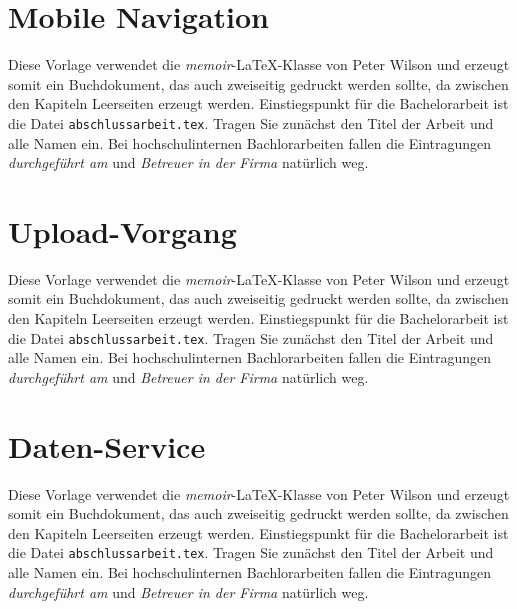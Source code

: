 \section{Mobile Navigation}
\label{sec:umsetzung}
%
Diese Vorlage verwendet die \textit{memoir}-LaTeX-Klasse von Peter Wilson und erzeugt somit ein Buchdokument, das auch zweiseitig gedruckt werden sollte, da zwischen den Kapiteln Leerseiten erzeugt werden. Einstiegspunkt für die Bachelorarbeit ist die Datei \texttt{abschlussarbeit.tex}. Tragen Sie zunächst den Titel der Arbeit und alle Namen ein. Bei hochschulinternen Bachlorarbeiten fallen die Eintragungen \textit{durchgeführt am} und \textit{Betreuer in der Firma} natürlich weg.

\section{Upload-Vorgang}
\label{sec:umsetzung}
%
Diese Vorlage verwendet die \textit{memoir}-LaTeX-Klasse von Peter Wilson und erzeugt somit ein Buchdokument, das auch zweiseitig gedruckt werden sollte, da zwischen den Kapiteln Leerseiten erzeugt werden. Einstiegspunkt für die Bachelorarbeit ist die Datei \texttt{abschlussarbeit.tex}. Tragen Sie zunächst den Titel der Arbeit und alle Namen ein. Bei hochschulinternen Bachlorarbeiten fallen die Eintragungen \textit{durchgeführt am} und \textit{Betreuer in der Firma} natürlich weg.

\section{Daten-Service}
\label{sec:umsetzung}
%
Diese Vorlage verwendet die \textit{memoir}-LaTeX-Klasse von Peter Wilson und erzeugt somit ein Buchdokument, das auch zweiseitig gedruckt werden sollte, da zwischen den Kapiteln Leerseiten erzeugt werden. Einstiegspunkt für die Bachelorarbeit ist die Datei \texttt{abschlussarbeit.tex}. Tragen Sie zunächst den Titel der Arbeit und alle Namen ein. Bei hochschulinternen Bachlorarbeiten fallen die Eintragungen \textit{durchgeführt am} und \textit{Betreuer in der Firma} natürlich weg.